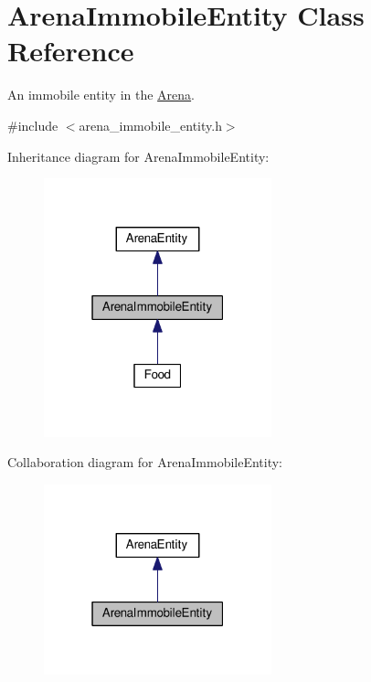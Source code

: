 \hypertarget{classArenaImmobileEntity}{}\section{Arena\+Immobile\+Entity Class Reference}
\label{classArenaImmobileEntity}


An immobile entity in the \hyperlink{classArena}{Arena}.  




{\ttfamily \#include $<$arena\+\_\+immobile\+\_\+entity.\+h$>$}



Inheritance diagram for Arena\+Immobile\+Entity\+:\nopagebreak
\begin{figure}[H]
\begin{center}
\leavevmode
\includegraphics[width=187pt]{classArenaImmobileEntity__inherit__graph}
\end{center}
\end{figure}


Collaboration diagram for Arena\+Immobile\+Entity\+:\nopagebreak
\begin{figure}[H]
\begin{center}
\leavevmode
\includegraphics[width=187pt]{classArenaImmobileEntity__coll__graph}
\end{center}
\end{figure}
